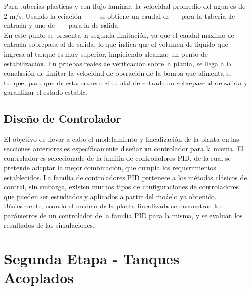 \documentclass[a4paper,12pt,twoside]{proyectotanquesecci}
\begin{document}
Para tuberias plasticas y con flujo laminar, la velocidad promedio del agua es de 2 m/s. Usando la eciación ------ se obtiene un caudal de --- para la tuberia de entrada y uno de ---- para la de salida. \\ 

En este punto se presenta la segunda limitación, ya que el caudal maximo de entrada sobrepasa al de salida, lo que indica que el volumen de liquido que ingresa al tanque es muy superior, impidiendo alcanzar un punto de estabilización. En pruebas reales de verificación sobre la planta, se llega a la conclusión de limitar la velocidad de operación de la bomba que alimenta el tanque, para que de esta manera el caudal de entrada no sobrepase al de salida y garantizar el estado estable. \\


 





\subsection{Diseño de Controlador}

El objetivo de llevar a cabo el modelamiento y linealización de la planta en las secciones anteriores es específicamente diseñar un controlador para la misma. El controlador es seleccionado de la familia de controladores PID, de la cual se pretende adoptar la mejor combinación, que cumpla los requerimientos establecidos. La familia de controladores PID pertenece a los métodos clásicos de control, sin embargo, existen muchos tipos de configuraciones de controladores que pueden ser estudiados y aplicados a partir del modelo ya obtenido. \\


Básicamente, usando el modelo de la planta linealizada se encuentran los parámetros de un controlador de la familia PID para la misma, y se evaluan los resultados de las simulaciones.




\section{Segunda Etapa - Tanques Acoplados}
\end{document}
